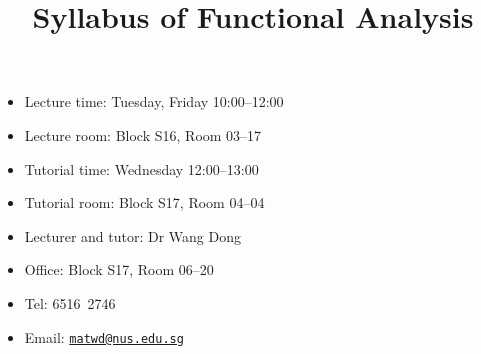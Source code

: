 \documentclass[a4paper]{article}
\title{Syllabus of Functional Analysis}
\date{}
\begin{document}
\maketitle

\begin{minipage}[t]{0.5\linewidth}
  \begin{itemize}[leftmargin=*]
  \item Lecture time: Tuesday, Friday 10:00--12:00
  \item Lecture room: Block S16, Room 03--17
  \item Tutorial time: Wednesday 12:00--13:00
  \item Tutorial room: Block S17, Room 04--04 
  \end{itemize}
\end{minipage}
\begin{minipage}[t]{0.4\linewidth}
  \begin{itemize}
  \item Lecturer and tutor: Dr Wang Dong
  \item Office: Block S17, Room 06--20
  \item Tel: 6516\ 2746
  \item Email: \href{mailto:matwd@nus.edu.sg}{\nolinkurl{matwd@nus.edu.sg}}
  \end{itemize}
\end{minipage}
\end{document}
